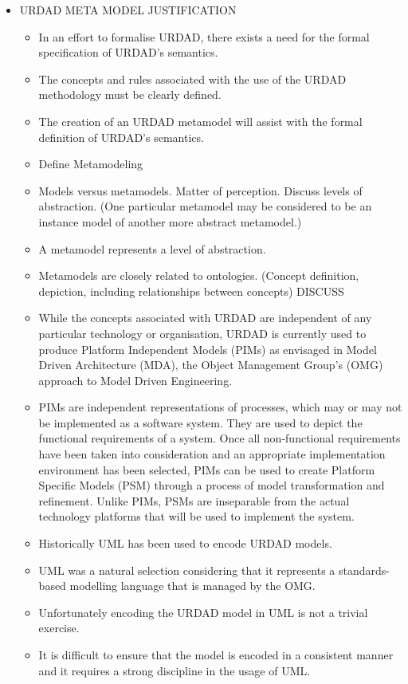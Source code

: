 \begin{itemize}

	\item URDAD META MODEL JUSTIFICATION
	\begin{itemize}
		\item In an effort to formalise URDAD, there exists a need for the formal specification of URDAD's semantics. 
		\item The concepts and rules associated with the use of the URDAD methodology must be clearly defined.
		\item The creation of an URDAD metamodel will assist with the formal definition of URDAD's semantics.
		\item Define Metamodeling
		\item Models versus metamodels. Matter of perception. Discuss levels of abstraction. (One particular metamodel may be considered to be an instance model of another more abstract metamodel.) 
		\item A metamodel represents a level of abstraction.
		\item	Metamodels are closely related to ontologies. (Concept definition, depiction, including relationships between concepts) DISCUSS
		\item While the concepts associated with URDAD are independent of any particular technology or organisation, URDAD is currently used to produce Platform Independent Models (PIMs) as envisaged in Model Driven Architecture (MDA), the Object Management Group's (OMG) approach to Model Driven Engineering. 
		\item PIMs are independent representations of processes, which may or may not be implemented as a software system. They are used to depict the functional requirements of a system. Once all non-functional requirements have been taken into consideration and an appropriate implementation environment has been selected, PIMs can be used to create Platform Specific Models (PSM) through a process of model transformation and refinement. Unlike PIMs, PSMs are inseparable from the actual technology platforms that will be used to implement the system.
		\item	Historically UML has been used to encode URDAD models. 
		\item	UML was a natural selection considering that it represents a standards-based modelling language that is managed by the OMG.
		\item	Unfortunately encoding the URDAD model in UML is not a trivial exercise.
		\item	It is difficult to ensure that the model is encoded in a consistent manner and it requires a strong discipline in the usage of UML.

\end{itemize}
\end{itemize}
